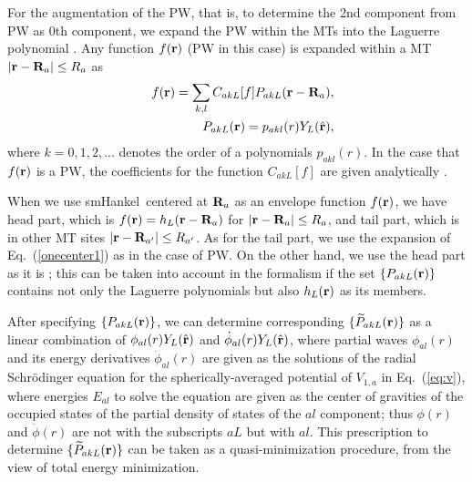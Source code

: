 \documentclass[a4paper,10pt,aip,onecolumn,amsmath,amssymb,floatfix,rmp]{revtex4-1}
\newcommand{\bfr}{{\bf r}}
\newcommand{\hbfr}{\hat{\bf r}}
\newcommand{\bfR}{{\bf R}}
\def\phidot{\dot{\phi}}
\newcommand{\req}[1]{\mbox{Eq.~\!(\ref{#1})}}
\def\smh{smHankel}
\def\pakl{p_{akl}}
\def\PakL{P_{akL}}
\def\wPakL{\widetilde{P}_{akL}}
\def\CakL{C_{akL}}
\begin{document}
\begin{widetext}
For the augmentation of the PW, that is, to determine the 2nd component
from PW as 0th component, we expand the PW within the MTs into the
Laguerre polynomial \cite{pmt1}.  Any function $f(\bfr)$ (PW in this
case) is expanded within a MT $|\bfr-\bfR_a|\leq R_a$ as
\begin{eqnarray}
&&f(\bfr)= \sum_{k,l} \CakL[f] \PakL(\bfr-\bfR_a), \label{onecenter1}\\
&&\PakL(\bfr)=\pakl(r) Y_L(\hbfr) \label{onecenter2},
\end{eqnarray}
where $k=0,1,2,...$ denotes the order of a polynomials $\pakl(r)$.  In
the case that $f(\bfr)$ is a PW, the coefficients for the function
$\CakL[f]$ are given analytically \cite{Bott98}.

When we use \smh\ centered at $\bfR_a$ as an envelope function
$f(\bfr)$, 
we have head part, which is $f(\bfr)=h_L(\bfr-\bfR_a)$ for
$|\bfr-\bfR_a| \leq R_a$, and tail part, which is in other MT
sites $|\bfr-\bfR_{a'}| \leq R_{a'}$.  As for the tail part, we use the
expansion of \req{onecenter1} as in the case of PW. On the other hand, we
use the head part as it is \cite{privatemark1};
this can be taken into account in the formalism 
if the set $\{\PakL(\bfr) \}$ contains not only the Laguerre
polynomials but also $h_L(\bfr)$ as its members.



After specifying $\{\PakL(\bfr) \}$, we can determine corresponding
$\{\wPakL(\bfr) \}$ as a linear combination of
$\phi_{al}(r)Y_L(\hat{\bfr})$ and $\phidot_{al}(r)Y_L(\hat{\bfr})$,
where partial waves $\phi_{al}(r)$ and its energy derivatives
$\phidot_{al}(r)$ are given as the solutions of the radial Schr\"odinger
equation for the spherically-averaged potential of $V_{1,a}$ in
\req{eq:v}, where energies $E_{al}$ to solve the equation are given as
the center of gravities of the occupied states of the partial density of
states of the $al$ component; thus 
$\phi(r)$ and $\phidot(r)$ are not with the subscripts $aL$ but with $al$.
This prescription to determine $\{\wPakL(\bfr) \}$ can be taken as a
quasi-minimization procedure, from the view of total energy
minimization.\\


\end{widetext}
\end{document}
